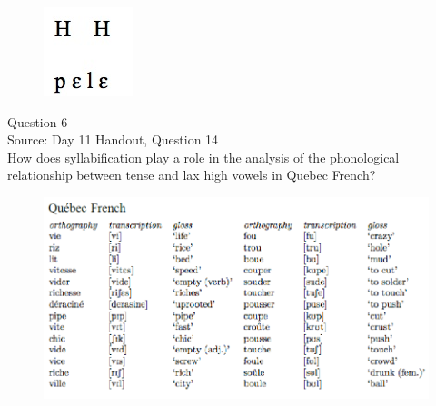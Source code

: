\documentclass[12pt]{article}
\begin{document}
\begin{figure}[H]
\includegraphics{../images/mende_house_b.png}
\end{figure}

\newpage

{\large Question 6}\\

Source: Day 11 Handout, Question 14\\

How does syllabification play a role in the analysis of the phonological relationship between tense and lax high vowels in Quebec French?\\

\begin{figure}[H]
\includegraphics{../images/quebecfrench.png}
\end{figure}

\newpage

\begin{center}
\textbf{{\color{red}{\HUGE END OF EXAM}}}\\

\end{center}
\newpage

\begin{center}
\textbf{{\color{blue}{\HUGE START OF EXAM\\}}}

\textbf{{\color{blue}{\HUGE Student ID: 3514\\}}}

\textbf{{\color{blue}{\HUGE 10:10 - 10:30 AM\\}}}

\end{center}
\newpage
\end{document}
